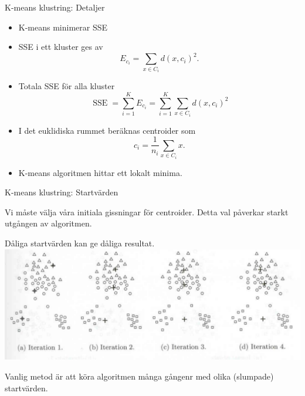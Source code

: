 \documentclass[10pt,english]{beamer}
\begin{document}
\begin{frame}{K-means klustring: Detaljer}

    \begin{itemize}
        \item K-means minimerar SSE
        \item SSE i ett kluster ges av
        \begin{equation*}
            E_{c_i} = \sum_{x \in C_i} d(x, c_i)^2.
        \end{equation*}
        \item Totala SSE för alla kluster
        \begin{equation*}
            \operatorname{SSE} = \sum_{i=1}^{K} E_{c_i} = \sum_{i=1}^{K} \sum_{x \in C_i} d(x, c_i)^2
        \end{equation*}
        \item I det euklidiska rummet beräknas centroider som
        \begin{equation*}
            c_i = \frac{1}{n_i} \sum_{x \in C_i} x.
        \end{equation*}
        \item K-means algoritmen hittar ett lokalt minima.
    \end{itemize}
    
\end{frame}



\begin{frame}{K-means klustring: Startvärden}

    Vi måste välja våra initiala gissningar för centroider. Detta val påverkar starkt utgången av algoritmen.

    Dåliga startvärden kan ge dåliga resultat.
    \includegraphics[width = \textwidth]{figs/dåliga start värden.png}

    Vanlig metod är att köra algoritmen många gångenr med olika (slumpade) startvärden.
    
\end{frame}
\end{document}
